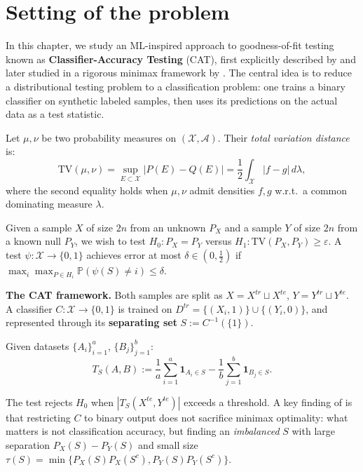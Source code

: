 \section{Setting of the problem}

In this chapter, we study an ML-inspired approach to goodness-of-fit testing known as
\textbf{Classifier-Accuracy Testing} (CAT), first explicitly described by \cite{friedmanCAT}
and later studied in a rigorous minimax framework by \cite{gerberclas}. The central
idea is to reduce a distributional testing problem to a classification problem: one trains a binary
classifier on synthetic labeled samples, then uses its predictions on the actual data as a test
statistic.

\begin{definition}
Let $\mu, \nu$ be two probability measures on $(\mathcal{X}, \mathcal{A})$. Their
\emph{total variation distance} is:
\[
    \mathrm{TV}(\mu, \nu) = \sup_{E \subset \mathcal{X}} |P(E) - Q(E)|
    = \frac{1}{2}\int_{\mathcal{X}} |f - g|\,d\lambda,
\]
where the second equality holds when $\mu, \nu$ admit densities $f, g$ w.r.t.\ a common
dominating measure $\lambda$.
\end{definition}

Given a sample $X$ of size $2n$ from an unknown $P_X$ and a sample $Y$ of size $2n$ from a
known null $P_Y$, we wish to test $H_0 : P_X = P_Y$ versus $H_1 : \mathrm{TV}(P_X, P_Y) \geq
\varepsilon$. A test $\psi : \mathcal{X} \to \{0,1\}$ achieves error at most $\delta \in
(0, \frac{1}{2})$ if $\max_{i}\max_{P \in H_i}\mathbb{P}(\psi(S) \neq i) \leq \delta$.

\medskip\noindent\textbf{The CAT framework.} Both samples are split as $X = X^{tr} \sqcup X^{te}$,
$Y = Y^{tr} \sqcup Y^{te}$. A classifier $C : \mathcal{X} \to \{0,1\}$ is trained on
$D^{tr} = \{(X_i, 1)\} \cup \{(Y_i, 0)\}$, and represented through its
\textbf{separating set} $S := C^{-1}(\{1\})$.

\begin{definition}
Given datasets $\{A_i\}_{i=1}^{a}$, $\{B_j\}_{j=1}^{b}$:
\[
    T_S(A, B) := \frac{1}{a}\sum_{i=1}^{a} \mathbf{1}_{A_i \in S}
               - \frac{1}{b}\sum_{j=1}^{b} \mathbf{1}_{B_j \in S}.
\]
\end{definition}

The test rejects $H_0$ when $|T_S(X^{te}, Y^{te})|$ exceeds a threshold. A key finding of
\cite{gerberclas} is that restricting $C$ to binary output does not sacrifice minimax optimality:
what matters is not classification accuracy, but finding an \emph{imbalanced} $S$ with large
separation $P_X(S) - P_Y(S)$ and small size $\tau(S) = \min\{P_X(S)P_X(S^c), P_Y(S)P_Y(S^c)\}$.

